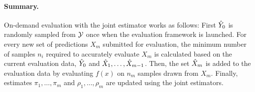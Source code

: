 \paragraph{Summary.}
On-demand evaluation with the joint estimator works as follows:
First ${\hat{Y}}_0$ is randomly sampled from $\mathcal{Y}$ once when the evaluation framework is launched.
For every new set of predictions $X_m$ submitted for evaluation, the minimum number of samples $n_i$ required to accurately evaluate $X_m$ is calculated based on the current evaluation data, ${\hat{Y}}_0$ and ${\hat{X}}_1, \ldots, {\hat{X}}_{m-1}$.
Then, the set ${\hat{X}}_m$ is added to the evaluation data by evaluating $f(x)$ on $n_m$ samples drawn from $X_m$.
Finally, estimates $\pi_1, \ldots, \pi_m$ and $\rho_1, \ldots, \rho_m$ are updated using the joint estimators.
